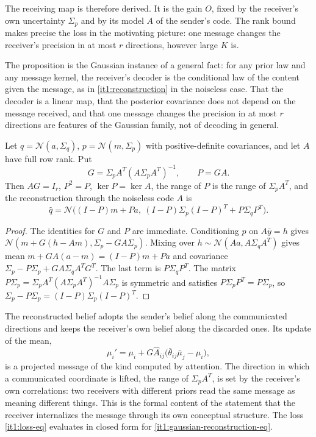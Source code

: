 \documentclass[11pt,letterpaper]{report}
\begin{document}
The receiving map is therefore derived. It is the gain $O$, fixed by the receiver's own uncertainty $\Sigma_p$ and by its model $A$ of the sender's code. The rank bound makes precise the loss in the motivating picture: one message changes the receiver's precision in at most $r$ directions, however large $K$ is.

The proposition is the Gaussian instance of a general fact: for any prior law and any message kernel, the receiver's decoder is the conditional law of the content given the message, as in \cref{it1:reconstruction} in the noiseless case. That the decoder is a linear map, that the posterior covariance does not depend on the message received, and that one message changes the precision in at most $r$ directions are features of the Gaussian family, not of decoding in general.

Let $q=\mathcal N(a,\Sigma_q)$, $p=\mathcal N(m,\Sigma_p)$ with positive-definite covariances, and let $A$ have full row rank. Put
\begin{equation}
G=\Sigma_pA^T(A\Sigma_pA^T)^{-1},\qquad P=GA.
\label{it1:projector}
\end{equation}
Then $AG=I_r$, $P^2=P$, $\ker P=\ker A$, the range of $P$ is the range of $\Sigma_pA^T$, and the reconstruction through the noiseless code $A$ is
\begin{equation}
\hat q=\mathcal N\bigl((I-P)m+Pa,\ (I-P)\Sigma_p(I-P)^T+P\Sigma_qP^T\bigr).
\label{it1:gaussian-reconstruction-eq}
\end{equation}
\begin{proof}
The identities for $G$ and $P$ are immediate. Conditioning $p$ on $A\bar y=h$ gives $\mathcal N(m+G(h-Am),\Sigma_p-GA\Sigma_p)$. Mixing over $h\sim\mathcal N(Aa,A\Sigma_qA^T)$ gives mean $m+GA(a-m)=(I-P)m+Pa$ and covariance $\Sigma_p-P\Sigma_p+GA\Sigma_qA^TG^T$. The last term is $P\Sigma_qP^T$. The matrix $P\Sigma_p=\Sigma_pA^T(A\Sigma_pA^T)^{-1}A\Sigma_p$ is symmetric and satisfies $P\Sigma_pP^T=P\Sigma_p$, so $\Sigma_p-P\Sigma_p=(I-P)\Sigma_p(I-P)^T$.
\end{proof}

The reconstructed belief adopts the sender's belief along the communicated directions and keeps the receiver's own belief along the discarded ones. Its update of the mean,
\begin{equation}
\mu_i'=\mu_i+G\hat A_{ij}\bigl(\bar\theta_{ij}\bar\mu_j-\mu_i\bigr),
\label{it1:mean-update}
\end{equation}
is a projected message of the kind computed by attention. The direction in which a communicated coordinate is lifted, the range of $\Sigma_pA^T$, is set by the receiver's own correlations: two receivers with different priors read the same message as meaning different things. This is the formal content of the statement that the receiver internalizes the message through its own conceptual structure. The loss \cref{it1:loss-eq} evaluates in closed form for \cref{it1:gaussian-reconstruction-eq}.
\end{document}
